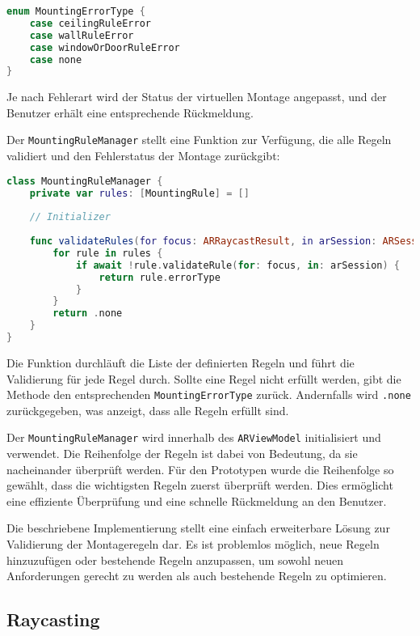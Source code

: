 \begin{lstlisting}[language=Swift]
enum MountingErrorType {
    case ceilingRuleError
    case wallRuleError
    case windowOrDoorRuleError
    case none
}
\end{lstlisting}

Je nach Fehlerart wird der Status der virtuellen Montage angepasst, und der Benutzer erhält eine entsprechende Rückmeldung.

Der \texttt{MountingRuleManager} stellt eine Funktion zur Verfügung, die alle Regeln validiert und den Fehlerstatus der Montage zurückgibt:


\begin{lstlisting}[language=Swift]
class MountingRuleManager {
    private var rules: [MountingRule] = []
    
    // Initializer
    
    func validateRules(for focus: ARRaycastResult, in arSession: ARSession) async -> errorType: MountingErrorType {
        for rule in rules {
            if await !rule.validateRule(for: focus, in: arSession) {
                return rule.errorType
            }
        }
        return .none
    }
}
\end{lstlisting}

Die Funktion durchläuft die Liste der definierten Regeln und führt die Validierung für jede Regel durch. Sollte eine Regel nicht erfüllt werden, gibt die Methode den entsprechenden \texttt{MountingErrorType} zurück. Andernfalls wird \texttt{.none} zurückgegeben, was anzeigt, dass alle Regeln erfüllt sind.

Der \texttt{MountingRuleManager} wird innerhalb des \texttt{ARViewModel} initialisiert und verwendet. Die Reihenfolge der Regeln ist dabei von Bedeutung, da sie nacheinander überprüft werden. Für den Prototypen wurde die Reihenfolge so gewählt, dass die wichtigsten Regeln zuerst überprüft werden. Dies ermöglicht eine effiziente Überprüfung und eine schnelle Rückmeldung an den Benutzer.

Die beschriebene Implementierung stellt eine einfach erweiterbare Lösung zur Validierung der Montageregeln dar. Es ist problemlos möglich, neue Regeln hinzuzufügen oder bestehende Regeln anzupassen, um sowohl neuen Anforderungen gerecht zu werden als auch bestehende Regeln zu optimieren.

\subsection{Raycasting}\label{Raycasting}

